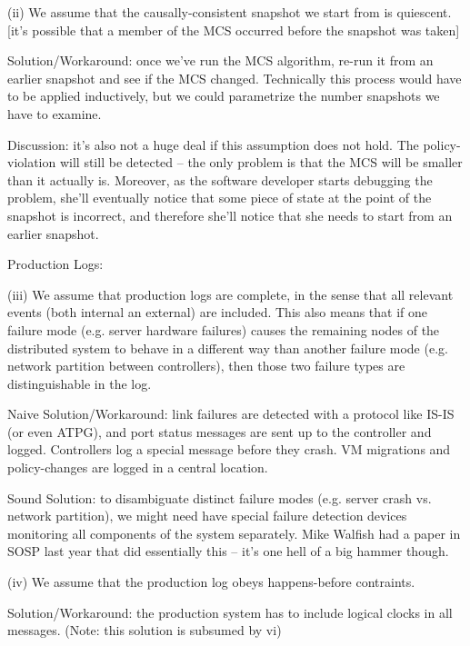 (ii) We assume that the causally-consistent snapshot we start from is quiescent. [it's possible that a member of the MCS occurred before the snapshot was taken]

Solution/Workaround: once we've run the MCS algorithm, re-run it from an earlier snapshot and see if the MCS changed. Technically this process would have to be applied inductively, but we could parametrize the number snapshots we have to examine.

Discussion: it's also not a huge deal if this assumption does not hold. The policy-violation will still be detected -- the only problem is that the MCS will be smaller than it actually is. Moreover, as the software developer starts debugging the problem, she'll eventually notice that some piece of state at the point of the snapshot is incorrect, and therefore she'll notice that she needs to start from an earlier snapshot.
                                                                                           
Production Logs:

(iii) We assume that production logs are complete, in the sense that all relevant events (both internal an external) are included. This also means that if one failure mode (e.g. server hardware failures) causes the remaining nodes of the distributed system to behave in a different way than another failure mode (e.g. network partition between controllers), then those two failure types are distinguishable in the log. 

Naive Solution/Workaround: link failures are detected with a protocol like IS-IS (or even ATPG), and port status messages are sent up to the controller and logged. Controllers log a special message before they crash. VM migrations and policy-changes are logged in a central location.

Sound Solution: to disambiguate distinct failure modes (e.g. server crash vs. network partition), we might need have special failure detection devices monitoring all components of the system separately. Mike Walfish had a paper in SOSP last year that did essentially this -- it's one hell of a big hammer though.
                           
(iv) We assume that the production log obeys happens-before contraints.
 
Solution/Workaround: the production system has to include logical clocks in all messages. (Note: this solution is subsumed by vi)                                                                                      
                 
